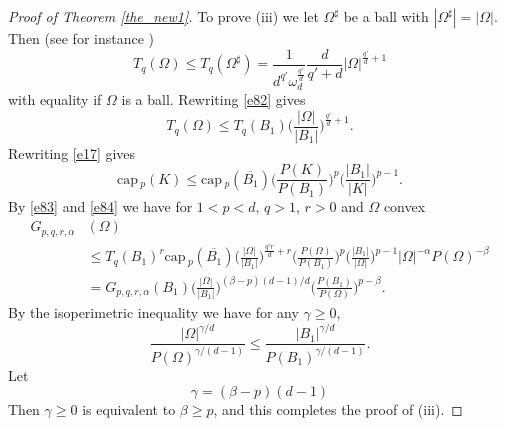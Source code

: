 \documentclass[a4paper,9pt]{article}
\def\cp{\mathrm{cap}\,}
\newcommand{\Om}{\Omega}
\begin{document}
\begin{proof}[Proof of Theorem \ref{the_new1}]
 To prove (iii) we let $\Omega^{\sharp} $ be  a ball with $|\Omega^{\sharp}|=|\Omega|$. Then  (see for instance \cite{ta})
\begin{equation}\label{e82}
T_q(\Omega) \le T_q(\Omega^{\sharp})=\frac{1}{d^{q'}\omega_d^{\frac{q'}{d}}}\frac{d}{q'+d}|\Omega|^{\frac{q'}{d}+1}
\end{equation}
with equality if $\Om$ is a ball. Rewriting \eqref{e82} gives
\begin{equation}\label{e83}
T_q(\Omega) \le T_q(B_1)\Big(\frac{|\Omega|}{|B_1|}\Big)^{\frac{q'}{d}+1}.
\end{equation}
Rewriting \eqref{e17} gives
\begin{equation}\label{e84}
\cp_p(K)\le \cp_p(\overline{B_1})\Big(\frac{P(K)}{P(B_1)}\Big)^p\Big(\frac{|B_1|}{|K|}\Big)^{p-1}.
\end{equation}
By \eqref{e83} and \eqref{e84} we have for $1<p<d,\,q>1$, $r>0$  and $\Om$ convex
\begin{align*}%
G_{p,q,r,\alpha}&(\Om)\nonumber \\
&\le T_q(B_1)^r\cp_p(\overline{B_1})\Big(\frac{|\Omega|}{|B_1|}\Big)^{\frac{q'r}{d}+r}\Big(\frac{P(\Om)}{P(B_1)}\Big)^p\Big(\frac{|B_1|}{|\Om|}\Big)^{p-1}|\Om|^{-\alpha}P(\Om)^{-\beta}\nonumber\\&
=G_{p,q,r,\alpha}(B_1)\Big(\frac{|\Om|}{|B_1|}\Big)^{(\beta-p)(d-1)/d}\Big(\frac{P(B_1)}{P(\Om)}\Big)^{p-\beta}.
\end{align*}
By the isoperimetric inequality we have for any $\gamma\ge 0$,
\begin{equation*}%
\frac{|\Om|^{\gamma/d}}{P(\Om)^{\gamma/(d-1)}}\le \frac{|B_1|^{\gamma/d}}{P(B_1)^{\gamma/(d-1)}}.
\end{equation*}
Let
\begin{equation*}%
\gamma=(\beta-p)(d-1)
\end{equation*}
Then $\gamma\ge 0$ is equivalent to $\beta \ge p$, and this completes the proof of (iii).


\end{proof}
\end{document}
